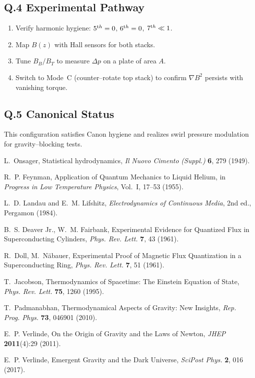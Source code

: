 \documentclass[12pt]{article}
\begin{document}
\subsection*{Q.4 Experimental Pathway}
    \begin{enumerate}\itemsep2pt
    \item Verify harmonic hygiene: $5^{\textrm th}=0$, $6^{\textrm th}=0$, $7^{\textrm th}\ll1$.
    \item Map $B(z)$ with Hall sensors for both stacks.
    \item Tune $B_B/B_T$ to measure $\Delta p$ on a plate of area $A$.
    \item Switch to Mode~C (counter--rotate top stack) to confirm $\nabla B^2$ persists with vanishing torque.
    \end{enumerate}

\subsection*{Q.5 Canonical Status}
    This configuration satisfies Canon hygiene and realizes swirl pressure modulation for gravity--blocking tests.

    
    \begin{thebibliography}{99}

    L.~Onsager,
    Statistical hydrodynamics,
    \emph{Il Nuovo Cimento (Suppl.)} \textbf{6}, 279 (1949).

    R.~P. Feynman,
    Application of Quantum Mechanics to Liquid Helium,
    in \emph{Progress in Low Temperature Physics}, Vol.~I, 17--53 (1955).

    L.~D. Landau and E.~M. Lifshitz,
    \emph{Electrodynamics of Continuous Media}, 2nd ed.,
    Pergamon (1984).

    B.~S. Deaver Jr., W.~M. Fairbank,
    Experimental Evidence for Quantized Flux in Superconducting Cylinders,
    \emph{Phys. Rev. Lett.} \textbf{7}, 43 (1961).

    R.~Doll, M.~N{\"a}bauer,
    Experimental Proof of Magnetic Flux Quantization in a Superconducting Ring,
    \emph{Phys. Rev. Lett.} \textbf{7}, 51 (1961).

    T.~Jacobson,
    Thermodynamics of Spacetime: The Einstein Equation of State,
    \emph{Phys. Rev. Lett.} \textbf{75}, 1260 (1995).

    T.~Padmanabhan,
    Thermodynamical Aspects of Gravity: New Insights,
    \emph{Rep. Prog. Phys.} \textbf{73}, 046901 (2010).

    E.~P. Verlinde,
    On the Origin of Gravity and the Laws of Newton,
    \emph{JHEP} \textbf{2011}(4):29 (2011).

    E.~P. Verlinde,
    Emergent Gravity and the Dark Universe,
    \emph{SciPost Phys.} \textbf{2}, 016 (2017).

    \end{thebibliography}
\end{document}
